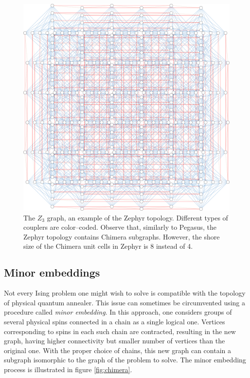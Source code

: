 \begin{figure}
    \includegraphics[width=\textwidth]{figures/zephyr}
    \caption{
        The $Z_3$ graph, an example of the Zephyr topology. Different types of couplers are
        color--coded. Observe that, similarly to Pegasus, the Zephyr topology contains Chimera
        subgraphs. However, the shore size of the Chimera unit cells in Zephyr is 8 instead of 4.
    }
    \label{fig:zephyr}
\end{figure}


\subsection{Minor embeddings}

Not every Ising problem one might wish to solve is compatible with the topology of physical quantum annealer. This issue can sometimes be circumvented using a procedure called \emph{minor embedding}. In this approach, one considers groups of several physical spins connected in a chain as a single logical one. Vertices corresponding to spins in each such chain are contracted, resulting in the new graph, having higher connectivity but smaller number of vertices than the original one. With the proper choice of chains, this new graph can contain a subgraph isomorphic to the graph of the problem to solve. The minor embedding process is illustrated in figure \ref{fig:chimera}.

